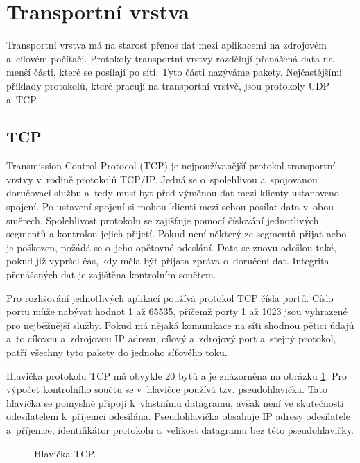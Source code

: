 \section{Transportní vrstva}
Transportní vrstva má na starost přenos dat mezi aplikacemi na zdrojovém a~cílovém počítači. Protokoly transportní vrstvy rozdělují přenášená data na menší části, které se posílají po síti. Tyto části nazýváme pakety. Nejčastějšími příklady protokolů, které pracují na transportní vrstvě, jsou protokoly UDP a~TCP.

\subsection{TCP}
Transmission Control Protocol (TCP) \cite{tcp} je nejpoužívanější protokol transportní vrstvy v~rodině protokolů TCP/IP. Jedná se o~spolehlivou a~spojovanou doručovací službu a~tedy musí byt před výměnou dat mezi klienty ustanoveno spojení. Po ustavení spojení si mohou klienti mezi sebou posílat data v~obou směrech. Spolehlivost protokolu se zajišťuje pomocí číslování jednotlivých segmentů a kontrolou jejich přijetí. Pokud není některý ze segmentů přijat nebo je poškozen, požádá se o~jeho opětovné odeslání. Data se znovu odešlou také, pokud již vypršel čas, kdy měla být přijata zpráva o~doručení dat. Integrita přenášených dat je zajištěna kontrolním součtem.

Pro rozlišování jednotlivých aplikací používá protokol TCP čísla portů. Číslo portu může nabývat hodnot 1 až 65535, přičemž porty 1 až 1023 jsou vyhrazené pro nejběžnější služby. Pokud má nějaká komunikace na síti shodnou pětici údajů a~to cílovou a~zdrojovou IP adresu, cílový a~zdrojový port a~stejný protokol, patří všechny tyto pakety do jednoho síťového toku.

Hlavička protokolu TCP má obvykle 20 bytů a je znázorněna na obrázku \ref{img:hlavika_tcp}. Pro výpočet kontrolního součtu se v~hlavičce používá tzv. pseudohlavička. Tato hlavička se pomyslně připojí k~vlastnímu datagramu, avšak není ve skutečnosti odesílatelem k~příjemci odesílána. Pseudohlavička obsahuje IP adresy odesílatele a~příjemce, identifikátor protokolu a~velikost datagramu bez této pseudohlavičky. 

\begin{figure}[H]
    \centering
    \caption{Hlavička TCP.}
    \label{img:hlavika_tcp}
\end{figure}

